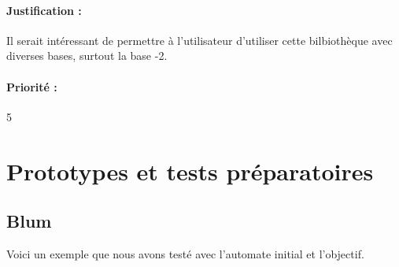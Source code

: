 \documentclass{article}%
\begin{document}
\paragraph{Justification :} Il serait intéressant de permettre à l'utilisateur d'utiliser cette bilbiothèque avec diverses bases, surtout la base -2.

\paragraph{Priorité :} 5

\section{Prototypes et tests préparatoires}

\subsection{Blum}

Voici un exemple que nous avons testé avec l'automate initial et l'objectif.
\end{document}
